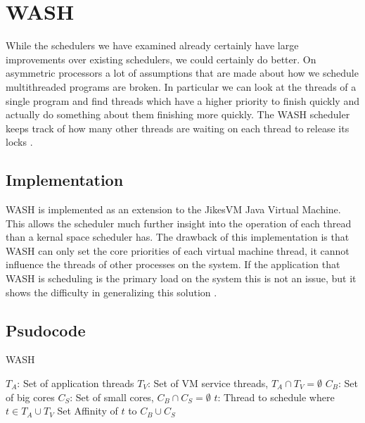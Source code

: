 \section{WASH}
While the schedulers we have examined already certainly have large improvements over existing schedulers, we could certainly do better.
On asymmetric processors a lot of assumptions that are made about how we schedule multithreaded programs are broken.
In particular we can look at the threads of a single program and find threads which have a higher priority to finish quickly and actually do something about them finishing more quickly.
The WASH scheduler keeps track of how many other threads are waiting on each thread to release its locks \cite{Jibaja:2016:PPA:2854038.2854047}.

\subsection{Implementation}
WASH is implemented as an extension to the JikesVM Java Virtual Machine.
This allows the scheduler much further insight into the operation of each thread than a kernal space scheduler has.
The drawback of this implementation is that WASH can only set the core priorities of each virtual machine thread, it cannot influence the threads of other processes on the system.
If the application that WASH is scheduling is the primary load on the system this is not an issue, but it shows the difficulty in generalizing this solution \cite{Jibaja:2016:PPA:2854038.2854047}.

\subsection{Psudocode}

\begin{algorithm}[H]
\caption{WASH}\label{euclid}
\begin{algorithmic}
		\State $T_A$: Set of application threads
		\State $T_V$: Set of VM service threads, $T_A \cap T_V = \emptyset$
		\State $C_B$: Set of big cores
		\State $C_S$: Set of small cores, $C_B \cap C_S = \emptyset$
		\State $t$: Thread to schedule where $t \in T_A \cup T_V$
			\EndIf
				\State Set Affinity of $t$ to $C_B \cup C_S$
			\EndIf
		\EndIf
	\EndFunction
\end{algorithmic}
\end{algorithm}
\cite{Jibaja:2016:PPA:2854038.2854047}
